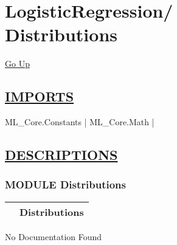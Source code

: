 \chapter*{\color{headfile}
{\large LogisticRegression\slash\hspace{0pt}}
 \\
Distributions
}
\hypertarget{ecldoc:toc:LogisticRegression.Distributions}{}
\hyperlink{ecldoc:toc:root/LogisticRegression}{Go Up}

\section*{\underline{\textsf{IMPORTS}}}
\begin{doublespace}
{\large
ML\_Core.Constants |
ML\_Core.Math |
}
\end{doublespace}

\section*{\underline{\textsf{DESCRIPTIONS}}}
\subsection*{\textsf{\colorbox{headtoc}{\color{white} MODULE}
Distributions}}

\hypertarget{ecldoc:LogisticRegression.Distributions}{}

{\renewcommand{\arraystretch}{1.5}
\begin{tabularx}{\textwidth}{|>{\raggedright\arraybackslash}l|X|}
\hline
\hspace{0pt}\mytexttt{\color{red} } & \textbf{Distributions} \\
\hline
\end{tabularx}
}

\par





No Documentation Found







